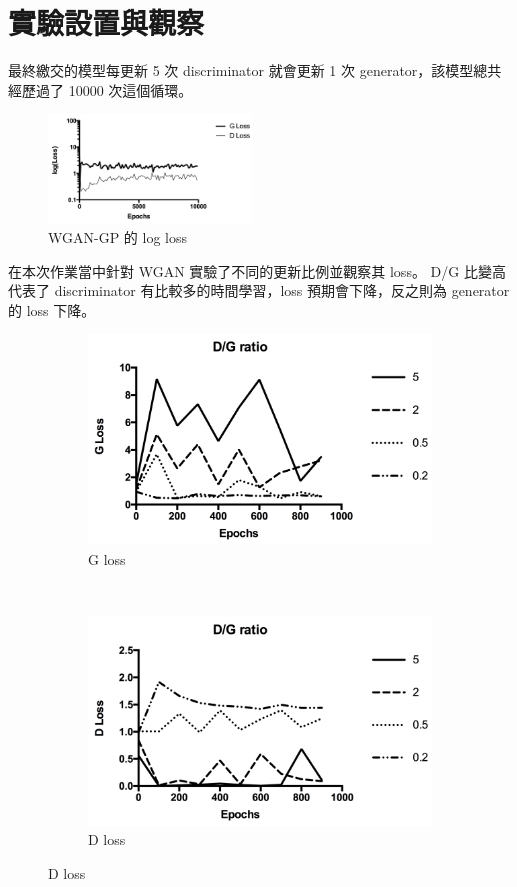 \documentclass[final,3p]{elsarticle}
\begin{document}
\section{實驗設置與觀察}
	最終繳交的模型每更新 5 次 discriminator 就會更新 1 次 generator，該模型總共經歷過了 10000 次這個循環。
	
	\begin{figure}[H]
		\centering
		\includegraphics[width=0.48\textwidth]{images/wgan_gp_loss}
		\caption{WGAN-GP 的 log loss} \label{fig:wgan_gp_loss}
	\end{figure}
	
	在本次作業當中針對 WGAN 實驗了不同的更新比例並觀察其 loss。
	D/G 比變高代表了 discriminator 有比較多的時間學習，loss 預期會下降，反之則為 generator 的 loss 下降。
	\begin{figure}[H]
		\centering
		\begin{subfigure}{.48\textwidth}
			\centering
			\includegraphics[width=\linewidth]{images/g_loss_dg}
			\caption{G loss}
		\end{subfigure}
		~
		\begin{subfigure}{.48\textwidth}
			\centering
			\includegraphics[width=\linewidth]{images/d_loss_dg}
			\caption{D loss}
		\end{subfigure}
		\label{fig:dg_loss}
	\end{figure}
	
\end{document}
